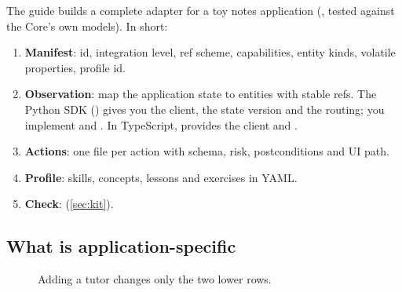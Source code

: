 The guide  builds a complete adapter for a toy notes application (, tested against the Core's own models). In short:

\begin{enumerate}[leftmargin=1.4em]
  \item \textbf{Manifest}: id, integration level, ref scheme, capabilities, entity kinds, volatile properties, profile id.
  \item \textbf{Observation}: map the application state to entities with stable refs. The Python SDK () gives you the client, the state version and the routing; you implement  and . In TypeScript,  provides the client and .
  \item \textbf{Actions}: one file per action with schema, risk, postconditions and UI path.
  \item \textbf{Profile}: skills, concepts, lessons and exercises in YAML.
  \item \textbf{Check}:  (\cref{sec:kit}).
\end{enumerate}

\subsection{What is application-specific}

\begin{figure}[H]
\centering
{}
\caption{Adding a tutor changes only the two lower rows.}\label{fig:appspecific}
\end{figure}

